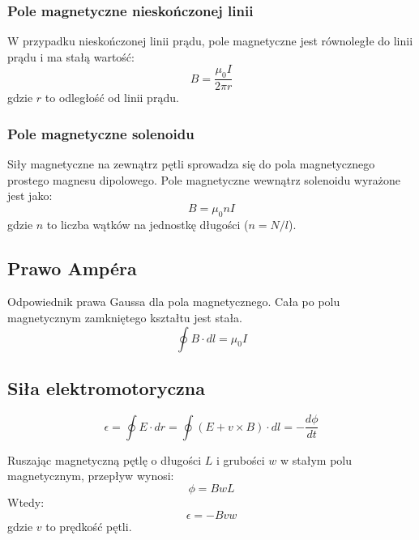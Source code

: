\documentclass{../notatki}
\begin{document}
\subsubsection{Pole magnetyczne nieskończonej linii}

W przypadku nieskończonej linii prądu, pole magnetyczne jest
równoległe do linii prądu i ma stałą wartość:
$$
B = \frac{\mu_0 I}{2 \pi r}
$$
gdzie $r$ to odległość od linii prądu.

\subsubsection{Pole magnetyczne solenoidu}

Siły magnetyczne na zewnątrz pętli sprowadza się do pola magnetycznego
prostego magnesu dipolowego. Pole magnetyczne wewnątrz solenoidu wyrażone jest
jako:
$$
B = \mu_0 nI
$$
gdzie $n$ to liczba wątków na jednostkę długości ($n = N/l$).

\subsection{Prawo Ampéra}

Odpowiednik prawa Gaussa dla pola magnetycznego. Cała po polu magnetycznym
zamkniętego kształtu jest stała.
$$
\oint B \cdot dl = \mu_0 I
$$

\subsection{Siła elektromotoryczna}

$$
\epsilon = \oint E \cdot dr = \oint (E + v \times B) \cdot dl =  -
\frac{d \phi}{dt}
$$

Ruszając magnetyczną pętlę o długości $L$ i grubości $w$ w stałym
polu magnetycznym, przepływ wynosi:
$$
\phi = BwL
$$
Wtedy:
$$
\epsilon = - Bvw
$$
gdzie $v$ to prędkość pętli.
\end{document}
